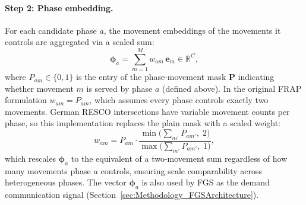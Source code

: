 \paragraph{Step 2: Phase embedding.}
For each candidate phase $a$, the movement embeddings of the movements it controls are aggregated via a scaled sum:
\begin{equation}
  \boldsymbol{\phi}_a = \sum_{m=1}^{M} w_{am}\,\mathbf{e}_m \in \mathbb{R}^{C},
  \label{eq:frap_phase_emb}
\end{equation}
where $P_{am}\in\{0,1\}$ is the entry of the phase-movement mask $\mathbf{P}$ indicating whether movement $m$ is served by phase $a$ (defined above). In the original FRAP formulation \citep{zheng2019learning} $w_{am} = P_{am}$, which assumes every phase controls exactly two movements. German RESCO intersections have variable movement counts per phase, so this implementation replaces the plain mask with a scaled weight:
\begin{equation}
  w_{am} = P_{am}\cdot\frac{\min\!\bigl(\textstyle\sum_{m'} P_{am'},\;2\bigr)}{\max\!\bigl(\textstyle\sum_{m'} P_{am'},\;1\bigr)},
  \label{eq:frap_weight}
\end{equation}
which rescales $\boldsymbol{\phi}_a$ to the equivalent of a two-movement sum regardless of how many movements phase $a$ controls, ensuring scale comparability across heterogeneous phases. The vector $\boldsymbol{\phi}_a$ is also used by FGS as the demand communication signal (Section~\ref{sec:Methodology_FGSArchitecture}).

